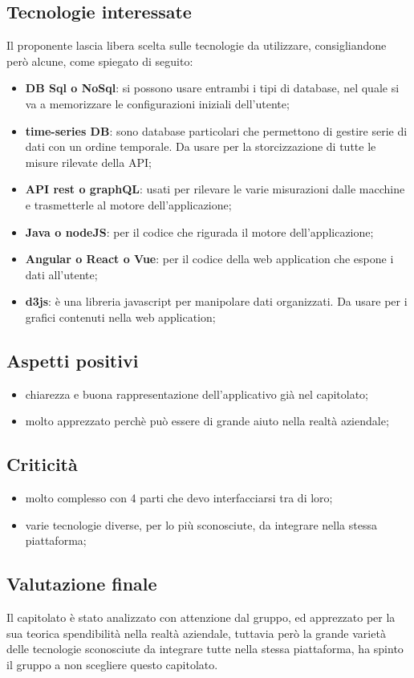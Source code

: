 	\subsection{Tecnologie interessate}
	Il proponente lascia libera scelta sulle tecnologie da utilizzare, consigliandone però alcune, come spiegato di seguito:
	\begin{itemize}
		\item \textbf{DB Sql o NoSql}: si possono usare entrambi i tipi di database, nel quale si va a memorizzare le configurazioni iniziali dell'utente;
		\item \textbf{time-series DB}: sono database particolari che permettono di gestire serie di dati con un ordine temporale. Da usare per la storcizzazione di tutte le misure rilevate della API;
		\item \textbf{API rest o graphQL}: usati per rilevare le varie misurazioni dalle macchine e trasmetterle al motore dell'applicazione;
		\item \textbf{Java o nodeJS}: per il codice che rigurada il motore dell'applicazione;
		\item \textbf{Angular o React o Vue}: per il codice della web application che espone i dati all'utente;
		\item \textbf{d3js}: è una libreria javascript per manipolare dati organizzati. Da usare per i grafici contenuti nella web application;
	\end{itemize}
	\subsection{Aspetti positivi}
	\begin{itemize}
		\item chiarezza e buona rappresentazione dell'applicativo già nel capitolato;
		\item molto apprezzato perchè può essere di grande aiuto nella realtà aziendale;
	\end{itemize}
	\subsection{Criticità}
	\begin{itemize}
		\item molto complesso con 4 parti che devo interfacciarsi tra di loro;
		\item varie tecnologie diverse, per lo più sconosciute, da integrare nella stessa piattaforma;
	\end{itemize}
	\subsection{Valutazione finale}
	Il capitolato è stato analizzato con attenzione dal gruppo, ed apprezzato per la sua teorica spendibilità nella realtà aziendale, tuttavia però la grande varietà delle tecnologie sconosciute da integrare tutte nella stessa piattaforma, ha spinto il gruppo a non scegliere questo capitolato.